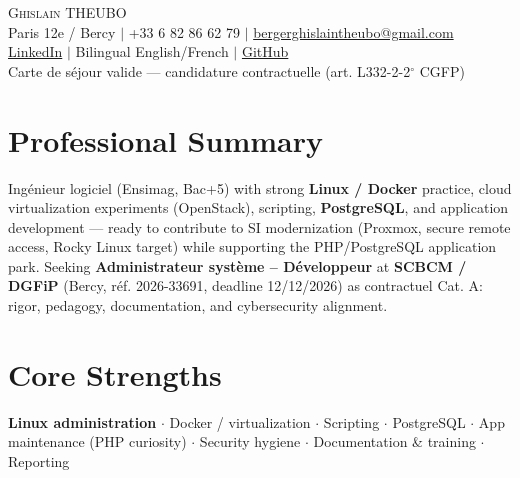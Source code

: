 \documentclass[letterpaper,10.5pt]{article}
\begin{document}
\begin{center}
{\Huge \scshape Ghislain THEUBO} \\ \vspace{2pt}
\small Paris 12e / Bercy $|$ +33 6 82 86 62 79 $|$ \href{mailto:bergerghislaintheubo@gmail.com}{bergerghislaintheubo@gmail.com} \\
\href{https://www.linkedin.com/in/berger-ghislain}{LinkedIn} $|$ Bilingual English/French $|$ \href{https://github.com/Bergerghislain}{GitHub} \\
\small Carte de s\'ejour valide --- candidature contractuelle (art. L332-2-2$^\circ$ CGFP)
\end{center}
\vspace{-6pt}
\section{Professional Summary}
\small{Ing\'enieur logiciel (Ensimag, Bac+5) with strong \textbf{Linux / Docker} practice, cloud virtualization experiments (OpenStack), scripting, \textbf{PostgreSQL}, and application development --- ready to contribute to SI modernization (Proxmox, secure remote access, Rocky Linux target) while supporting the PHP/PostgreSQL application park. Seeking \textbf{Administrateur syst\`eme -- D\'eveloppeur} at \textbf{SCBCM / DGFiP} (Bercy, r\'ef. 2026-33691, deadline 12/12/2026) as contractuel Cat. A: rigor, pedagogy, documentation, and cybersecurity alignment.}
\section{Core Strengths}
\small{\textbf{Linux administration} $\cdot$ Docker / virtualization $\cdot$ Scripting $\cdot$ PostgreSQL $\cdot$ App maintenance (PHP curiosity) $\cdot$ Security hygiene $\cdot$ Documentation \& training $\cdot$ Reporting}
\end{document}

